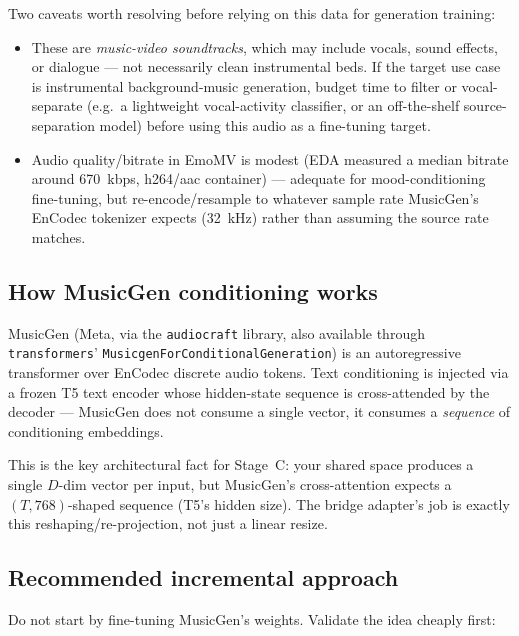 \documentclass[11pt]{article}
\begin{document}
Two caveats worth resolving before relying on this data for generation training:
\begin{itemize}
\item These are \emph{music-video soundtracks}, which may include vocals, sound effects, or
dialogue — not necessarily clean instrumental beds. If the target use case is instrumental
background-music generation, budget time to filter or vocal-separate (e.g.\ a lightweight
vocal-activity classifier, or an off-the-shelf source-separation model) before using this audio as
a fine-tuning target.
\item Audio quality/bitrate in EmoMV is modest (EDA measured a median bitrate around 670~kbps,
h264/aac container) — adequate for mood-conditioning fine-tuning, but re-encode/resample to
whatever sample rate MusicGen's EnCodec tokenizer expects (32~kHz) rather than assuming the
source rate matches.
\end{itemize}

\subsection{How MusicGen conditioning works}
MusicGen (Meta, via the \texttt{audiocraft} library, also available through
\texttt{transformers}' \texttt{MusicgenForConditionalGeneration}) is an autoregressive
transformer over EnCodec discrete audio tokens. Text conditioning is injected via a frozen T5
text encoder whose hidden-state sequence is cross-attended by the decoder — MusicGen does not
consume a single vector, it consumes a \emph{sequence} of conditioning embeddings.

This is the key architectural fact for Stage~C: your shared space produces a single $D$-dim
vector per input, but MusicGen's cross-attention expects a $(T, 768)$-shaped sequence (T5's
hidden size). The bridge adapter's job is exactly this reshaping/re-projection, not just a linear
resize.

\subsection{Recommended incremental approach}
Do not start by fine-tuning MusicGen's weights. Validate the idea cheaply first:
\end{document}

